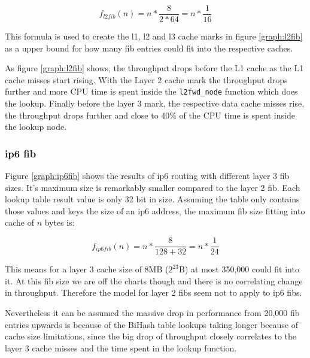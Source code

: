 $$ f_{l2fib}(n) = n * \frac{8}{2 * 64} = n * \frac{1}{16}  $$

This formula is used to create the l1, l2 and l3 cache marks in figure
\ref{graph:l2fib} as a upper bound for how many fib entries could fit
into the respective caches. 

As figure \ref{graph:l2fib} shows, the throughput drops before the L1
cache as the L1 cache misses start rising. With the Layer 2 cache mark
the throughput drops further and more CPU time is spent inside the
\lstinline|l2fwd_node| function which does the lookup. Finally before
the layer 3 mark, the respective data cache misses rise, the
throughput drops further and close to 40\% of the CPU time is spent
inside the lookup node.





\subsubsection{\Ac{ip6} \Ac{fib}}

Figure \ref{graph:ip6fib} shows the results of \Ac{ip6} routing with
different layer 3 \Ac{fib} sizes. It's maximum size is remarkably
smaller compared to the layer 2 \Ac{fib}. Each lookup table result
value is only 32 bit in size. Assuming the table only contains those
values and keys the size of an \Ac{ip6} address, the maximum \Ac{fib}
size fitting into cache of $n$ bytes is:

$$ f_{ip6fib}(n) = n * \frac{8}{128 + 32} = n * \frac{1}{24}  $$

This means for a layer 3 cache size of 8MB ($2^{23}$B) at most 350,000
could fit into it. At this \Ac{fib} size we are off the charts though
and there is no correlating change in throughput. Therefore the model
for layer 2 \Ac{fib}s seem not to apply to \Ac{ip6} \Ac{fib}s.



Nevertheless it can be assumed the massive drop in performance
from 20,000 \Ac{fib} entries upwards is because of the BiHash table lookups taking longer because of cache size limitations, since the big drop of throughput closely correlates to the layer 3 cache misses and the time spent in the lookup function. 







